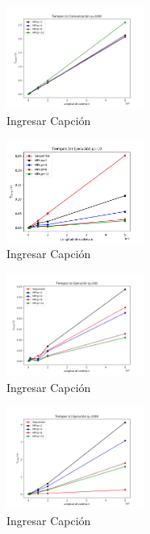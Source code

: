 \begin{figure}[H]
    \centerline{
        \includegraphics[width=0.4\textwidth]{graficos/tiempos_comunicacion_q1000.png}
    }
    \caption{Ingresar Capción}
    \label{grafico:tiempos_comunicacion_q1000}
\end{figure}
\begin{figure}[H]
    \centerline{
        \includegraphics[width=0.4\textwidth]{graficos/tiempos_ejecucion_q10.png}
    }
    \caption{Ingresar Capción}
    \label{grafico:tiempos_ejecucion_q10}
\end{figure}
\begin{figure}[H]
    \centerline{
        \includegraphics[width=0.4\textwidth]{graficos/tiempos_ejecucion_q100.png}
    }
    \caption{Ingresar Capción}
    \label{grafico:tiempos_ejecucion_q100}
\end{figure}
\begin{figure}[H]
    \centerline{
        \includegraphics[width=0.4\textwidth]{graficos/tiempos_ejecucion_q1000.png}
    }
    \caption{Ingresar Capción}
    \label{grafico:tiempos_ejecucion_q1000}
\end{figure}
